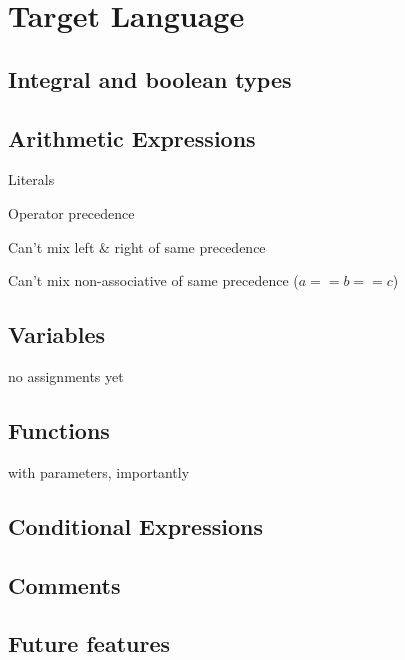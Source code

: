 
    \section{Target Language}
    
        \subsection{Integral and boolean types}
    
        \subsection{Arithmetic Expressions}
        
            Literals
            
            Operator precedence
            
            Can't mix left \& right of same precedence
            
            Can't mix non-associative of same precedence ($a==b==c$)
        
        \subsection{Variables}
            
            no assignments yet
        
        \subsection{Functions}
        
            with parameters, importantly
        
        \subsection{Conditional Expressions}
        
        \subsection{Comments}
        
        \subsection{Future features}
            
